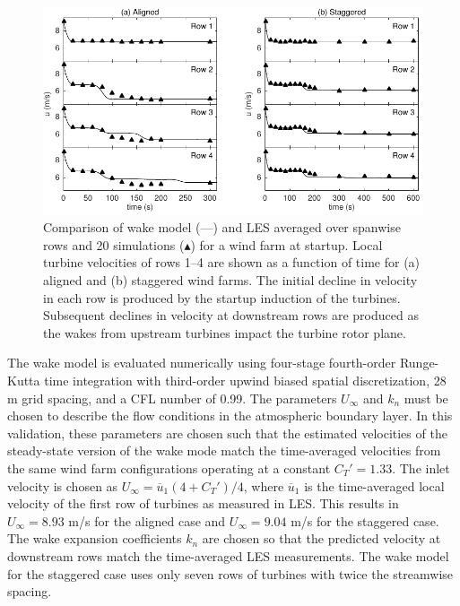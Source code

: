 \begin{figure}[h]
\centering
\includegraphics[width=\textwidth]{./fig/startup.pdf}
\caption{Comparison of wake model (---) and LES  averaged over spanwise rows and 20 simulations ($\blacktriangle$) for a wind farm at startup. Local turbine velocities of rows 1--4 are shown as a function of time for (a) aligned and (b) staggered wind farms. The initial decline in velocity in each row is produced by the startup induction of the turbines. Subsequent declines in velocity at downstream rows are produced as the wakes from upstream turbines impact the turbine rotor plane.}
\label{fig:compare}
\end{figure}

The wake model is evaluated numerically using four-stage fourth-order Runge-Kutta time integration with third-order upwind biased spatial discretization, 28 m grid spacing, and a CFL number of 0.99. The parameters $U_\infty$ and $k_n$ must be chosen to describe the flow conditions in the atmospheric boundary layer. In this validation, these parameters are chosen such that the estimated velocities of the steady-state version of the wake mode match the time-averaged velocities from the same wind farm configurations operating at a constant $C_T'=1.33$. The inlet velocity is chosen as $U_\infty = \overline{u}_1(4+C_T')/4$, where $ \overline{u}_1$ is the time-averaged local velocity of the first row of turbines as measured in LES. This results in $U_\infty = 8.93$ m/s for the aligned case and $U_\infty = 9.04$ m/s for the staggered case. The wake expansion coefficients $k_n$ are chosen so that the predicted velocity at downstream rows match the time-averaged LES measurements. The wake model for the staggered case uses only seven rows of turbines with twice the streamwise spacing. 

